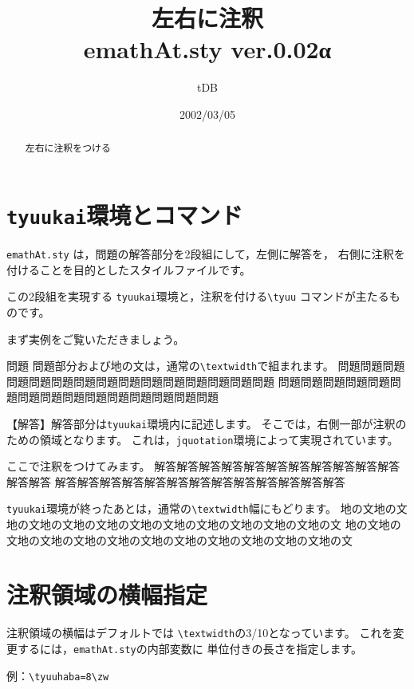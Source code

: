 \documentclass[a4j,fleqn]{jarticle}
\begin{document}
\title{左右に注釈\\
emathAt.sty {\normalsize ver.0.02α}}
\author{tDB}
\date{2002/03/05}

\maketitle\thispagestyle{empty}
\begin{abstract}%
\centerline{左右に注釈をつける}
\end{abstract}

\tableofcontents

\pagebreak
{}

\section{\texttt{tyuukai}環境とコマンド}
\verb+emathAt.sty+ は，問題の解答部分を2段組にして，左側に解答を，
右側に注釈を付けることを目的としたスタイルファイルです。

この2段組を実現する \verb+tyuukai+環境と，注釈を付ける\verb+\tyuu+
コマンドが主たるものです。

まず実例をご覧いただきましょう。

\begin{itembox}{問題}
問題部分および地の文は，通常の\verb+\textwidth+で組まれます。
問題問題問題問題問題問題問題問題問題問題問題問題問題問題問題
問題問題問題問題問題問題問題問題問題問題問題問題問題問題問題
\end{itembox}
\begin{tyuukai}
【解答】解答部分は\verb+tyuukai+環境内に記述します。
そこでは，右側一部が注釈のための領域となります。
これは，\verb+jquotation+環境によって実現されています。

ここで注釈をつけてみます。
解答解答解答解答解答解答解答解答解答解答解答解答解答
解答解答解答解答解答解答解答解答解答解答解答解答解答
\end{tyuukai}

\verb+tyuukai+環境が終ったあとは，通常の\verb+\textwidth+幅にもどります。
地の文地の文地の文地の文地の文地の文地の文地の文地の文地の文地の文地の文
地の文地の文地の文地の文地の文地の文地の文地の文地の文地の文地の文地の文
\clearpage

\section{注釈領域の横幅指定}
注釈領域の横幅はデフォルトでは \verb+\textwidth+の3/10となっています。
これを変更するには，\verb+emathAt.sty+の内部変数に
単位付きの長さを指定します。
\begin{jquote}
 例：\verb+\tyuuhaba=8\zw+
\end{jquote}
\end{document}
